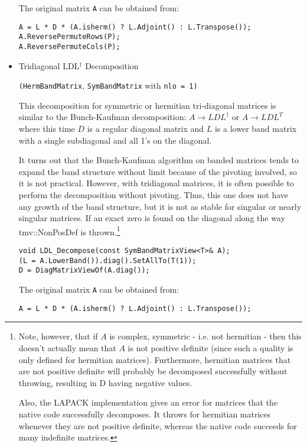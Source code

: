 \documentclass[twoside,letterpaper,11pt]{article}
\renewcommand{\tt}[1]{{\texttt {#1}}}
\begin{document}
\begin{itemize}
The original matrix \tt{A} can be obtained from:
\begin{verbatim}
A = L * D * (A.isherm() ? L.Adjoint() : L.Transpose());
A.ReversePermuteRows(P);
A.ReversePermuteCols(P);
\end{verbatim}

\item Tridiagonal LDL$^\dagger$ Decomposition 

\tt{(HermBandMatrix}, \tt{SymBandMatrix} with \tt{nlo = 1)}

This decomposition for symmetric or hermitian tri-diagonal matrices is 
similar to the Bunch-Kaufman decomposition: 
$A \rightarrow L D L^\dagger$
or $A \rightarrow L D L^T$ where this time $D$ is a regular diagonal matrix and $L$ is
a lower band matrix with a single subdiagonal and all 1's on the diagonal.

It turns out
that the Bunch-Kaufman algorithm on banded matrices tends to expand the band structure
without limit because of the pivoting involved, so it is not practical.
However, with tridiagonal matrices, it is often possible to perform the 
decomposition without pivoting.  Thus, this one does not have any growth of the band structure,
but it is not as stable for singular or nearly singular matrices.
If an exact zero is found on the diagonal along the way
tmv::NonPosDef is thrown.\footnote{
Note, however, that if $A$ is complex, symmetric - i.e. not hermitian -
then this doesn't actually mean that $A$ is not positive definite (since such a 
quality is only defined for hermitian matrices).  Furthermore, 
hermitian matrices that are not positive definite will probably be decomposed successfully
without throwing, resulting in D having negative values.

Also, the LAPACK implementation gives an error for matrices that the native code
successfully decomposes.  It throws for hermitian matrices whenever they are 
not positive definite, whereas the native code succeeds for many indefinite matrices.
}

\begin{verbatim}
void LDL_Decompose(const SymBandMatrixView<T>& A);
(L = A.LowerBand()).diag().SetAllTo(T(1));
D = DiagMatrixViewOf(A.diag());
\end{verbatim}

The original matrix \tt{A} can be obtained from:
\begin{verbatim}
A = L * D * (A.isherm() ? L.Adjoint() : L.Transpose());
\end{verbatim}


\end{itemize}
\end{document}

